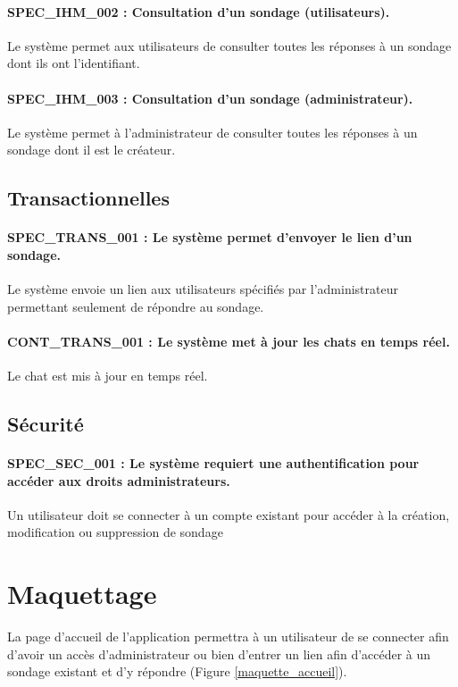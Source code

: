 \documentclass[titlepage]{report}
\begin{document}
\paragraph{SPEC\_IHM\_002 : Consultation d’un sondage (utilisateurs).}
Le système permet aux utilisateurs de consulter toutes les réponses à un sondage dont ils ont l’identifiant.

\paragraph{SPEC\_IHM\_003 : Consultation d’un sondage (administrateur).}
Le système permet à l’administrateur de consulter toutes les réponses à un sondage dont il est le créateur.

\subsection{Transactionnelles}

\paragraph{SPEC\_TRANS\_001 : Le système permet d'envoyer le lien d’un sondage.}
Le système envoie un lien aux utilisateurs spécifiés par l'administrateur permettant seulement de répondre au sondage.

\paragraph{CONT\_TRANS\_001 : Le système met à jour les chats en temps réel.}
Le chat est mis à jour en temps réel.

\subsection{Sécurité}
\paragraph{SPEC\_SEC\_001 : Le système requiert une authentification pour accéder aux droits administrateurs.}
Un utilisateur doit se connecter à un compte existant pour accéder à la création, modification ou suppression de sondage

\section{Maquettage}

La page d'accueil de l'application permettra à un utilisateur de se connecter afin d'avoir un accès d'administrateur ou bien d'entrer un lien afin d'accéder à un sondage existant et d'y répondre (Figure \ref{maquette_accueil}).
\end{document}
